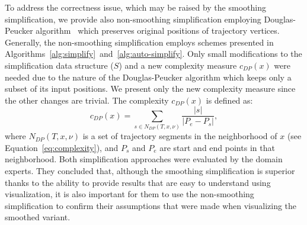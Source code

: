 To address the correctness issue, which may be raised by the smoothing simplification, we provide also non-smoothing simplification employing Douglas-Peucker algorithm~\cite{visvalingam1990douglas} which preserves original positions of trajectory vertices.
Generally, the non-smoothing simplification employs schemes presented in Algorithms~\ref{alg:simplify}~and~\ref{alg:auto-simplify}.
Only small modifications to the simplification data structure ($S$) and a new complexity measure $c_{DP}(x)$ were needed due to the nature of the Douglas-Peucker algorithm which keeps only a subset of its input positions.
We present only the new complexity measure since the other changes are trivial.
The complexity $c_{DP}(x)$ is defined as:
\begin{equation}
  c_{DP}(x) = \sum_{s \in N_{DP}(T, x, \nu)}{\frac{|s|}{|P_e - P_s|}},
\label{eq:complexity-dp}
\end{equation}
where $N_{DP}(T, x, \nu)$ is a set of trajectory segments in the neighborhood of $x$ (see Equation~\ref{eq:complexity}), and $P_s$ and $P_e$ are start and end points in that neighborhood.
Both simplification approaches were evaluated by the domain experts.
They concluded that, although the smoothing simplification is superior thanks to the ability to provide results that are easy to understand using visualization, it is also important for them to use the non-smoothing simplification to confirm their assumptions that were made when visualizing the smoothed variant.